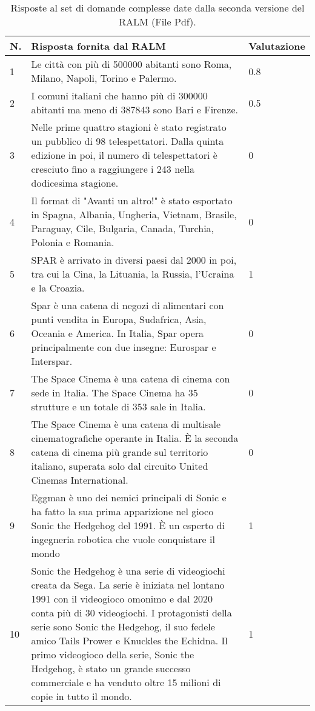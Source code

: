 \begin{table}[H]
    \centering
    \begin{tabular}{|p{0.5cm} |p{6cm} |p{2cm}|}
        \hline
        \textbf{N}. & \textbf{Risposta fornita dal RALM} & \textbf{Valutazione} \\
        \hline
        1 & Le città con più di 500000 abitanti sono Roma, Milano, Napoli, Torino e Palermo. & 0.8 \\
        \hline
        2 & I comuni italiani che hanno più di 300000 abitanti ma meno di 387843 sono Bari e Firenze. & 0.5 \\
        \hline
        3 & Nelle prime quattro stagioni è stato registrato un pubblico di 98 telespettatori. Dalla quinta edizione in poi, il numero di telespettatori è cresciuto fino a raggiungere i 243 nella dodicesima stagione. & 0 \\
        \hline
        4 & Il format di "Avanti un altro!" è stato esportato in Spagna, Albania, Ungheria, Vietnam, Brasile, Paraguay, Cile, Bulgaria, Canada, Turchia, Polonia e Romania. & 0 \\
        \hline
        5 & SPAR è arrivato in diversi paesi dal 2000 in poi, tra cui la Cina, la Lituania, la Russia, l'Ucraina e la Croazia. & 1 \\
        \hline
        6 & Spar è una catena di negozi di alimentari con punti vendita in Europa, Sudafrica, Asia, Oceania e America. In Italia, Spar opera principalmente con due insegne: Eurospar e Interspar. & 0 \\
        \hline
        7 & The Space Cinema è una catena di cinema con sede in Italia. The Space Cinema ha 35 strutture e un totale di 353 sale in Italia. & 0 \\
        \hline
        8 & The Space Cinema è una catena di multisale cinematografiche operante in Italia. È la seconda catena di cinema più grande sul territorio italiano, superata solo dal circuito United Cinemas International. & 0 \\
        \hline
        9 & Eggman è uno dei nemici principali di Sonic e ha fatto la sua prima apparizione nel gioco Sonic the Hedgehog del 1991. È un esperto di ingegneria robotica che vuole conquistare il mondo & 1 \\
        \hline
        10 & Sonic the Hedgehog è una serie di videogiochi creata da Sega. La serie è iniziata nel lontano 1991 con il videogioco omonimo e dal 2020 conta più di 30 videogiochi. I protagonisti della serie sono Sonic the Hedgehog, il suo fedele amico Tails Prower e Knuckles the Echidna. Il primo videogioco della serie, Sonic the Hedgehog, è stato un grande successo commerciale e ha venduto oltre 15 milioni di copie in tutto il mondo. & 1 \\
        \hline
    \end{tabular}
    \caption{Risposte al set di domande complesse date dalla seconda versione del RALM (File Pdf).}
\end{table}

